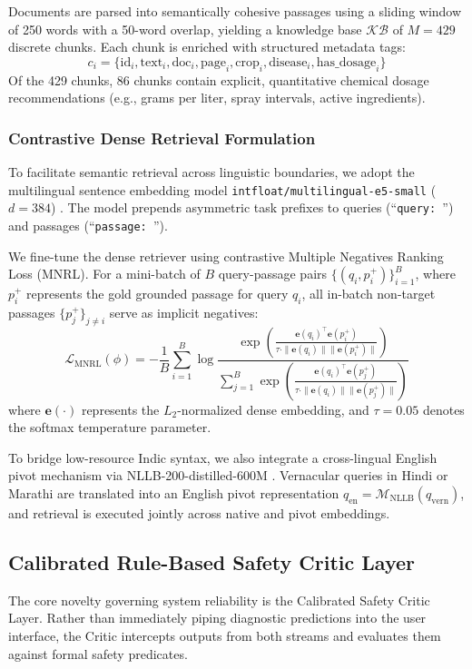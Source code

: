 \documentclass[conference]{IEEEtran}
\begin{document}
Documents are parsed into semantically cohesive passages using a sliding window of 250 words with a 50-word overlap, yielding a knowledge base $\mathcal{KB}$ of $M = 429$ discrete chunks. Each chunk is enriched with structured metadata tags:
\begin{equation}
c_i = \{ \text{id}_i, \text{text}_i, \text{doc}_i, \text{page}_i, \text{crop}_i, \text{disease}_i, \text{has\_dosage}_i \}
\end{equation}
Of the 429 chunks, 86 chunks contain explicit, quantitative chemical dosage recommendations (e.g., grams per liter, spray intervals, active ingredients).

\subsubsection{Contrastive Dense Retrieval Formulation}
To facilitate semantic retrieval across linguistic boundaries, we adopt the multilingual sentence embedding model \texttt{intfloat/multilingual-e5-small} ($d = 384$) \cite{wang2022text}. The model prepends asymmetric task prefixes to queries (``\texttt{query: }'') and passages (``\texttt{passage: }'').

We fine-tune the dense retriever using contrastive Multiple Negatives Ranking Loss (MNRL). For a mini-batch of $B$ query-passage pairs $\{(q_i, p_i^+)\}_{i=1}^B$, where $p_i^+$ represents the gold grounded passage for query $q_i$, all in-batch non-target passages $\{p_j^+\}_{j \neq i}$ serve as implicit negatives:
\begin{equation}
\mathcal{L}_{\text{MNRL}}(\phi) = -\frac{1}{B} \sum_{i=1}^{B} \log \frac{\exp\left(\frac{\mathbf{e}(q_i)^\top \mathbf{e}(p_i^+)}{\tau \cdot \|\mathbf{e}(q_i)\| \|\mathbf{e}(p_i^+)\|}\right)}{\sum_{j=1}^{B} \exp\left(\frac{\mathbf{e}(q_i)^\top \mathbf{e}(p_j^+)}{\tau \cdot \|\mathbf{e}(q_i)\| \|\mathbf{e}(p_j^+)\|}\right)}
\label{eq:mnrl}
\end{equation}
where $\mathbf{e}(\cdot)$ represents the $L_2$-normalized dense embedding, and $\tau = 0.05$ denotes the softmax temperature parameter. 

To bridge low-resource Indic syntax, we also integrate a cross-lingual English pivot mechanism via NLLB-200-distilled-600M \cite{costa2022no}. Vernacular queries in Hindi or Marathi are translated into an English pivot representation $q_{\text{en}} = \mathcal{M}_{\text{NLLB}}(q_{\text{vern}})$, and retrieval is executed jointly across native and pivot embeddings.

\subsection{Calibrated Rule-Based Safety Critic Layer}
The core novelty governing system reliability is the Calibrated Safety Critic Layer. Rather than immediately piping diagnostic predictions into the user interface, the Critic intercepts outputs from both streams and evaluates them against formal safety predicates.
\end{document}
